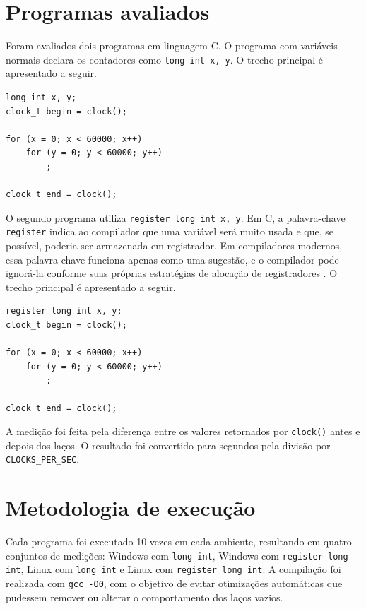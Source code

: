 \documentclass[12pt,oneside,a4paper,brazil]{abntex2}
\begin{document}
\section{Programas avaliados}

Foram avaliados dois programas em linguagem C. O programa com variáveis normais declara os contadores como \texttt{long int x, y}. O trecho principal é apresentado a seguir.

\begin{lstlisting}[style=codigoC,caption={Trecho principal com variáveis long int}]
long int x, y;
clock_t begin = clock();

for (x = 0; x < 60000; x++)
    for (y = 0; y < 60000; y++)
        ;

clock_t end = clock();
\end{lstlisting}

O segundo programa utiliza \texttt{register long int x, y}. Em C, a palavra-chave \texttt{register} indica ao compilador que uma variável será muito usada e que, se possível, poderia ser armazenada em registrador. Em compiladores modernos, essa palavra-chave funciona apenas como uma sugestão, e o compilador pode ignorá-la conforme suas próprias estratégias de alocação de registradores \cite{kernighan1988c,gcc2026}. O trecho principal é apresentado a seguir.

\begin{lstlisting}[style=codigoC,caption={Trecho principal com variáveis register long int}]
register long int x, y;
clock_t begin = clock();

for (x = 0; x < 60000; x++)
    for (y = 0; y < 60000; y++)
        ;

clock_t end = clock();
\end{lstlisting}

A medição foi feita pela diferença entre os valores retornados por \texttt{clock()} antes e depois dos laços. O resultado foi convertido para segundos pela divisão por \texttt{CLOCKS\_PER\_SEC}.

\section{Metodologia de execução}

Cada programa foi executado 10 vezes em cada ambiente, resultando em quatro conjuntos de medições: Windows com \texttt{long int}, Windows com \texttt{register long int}, Linux com \texttt{long int} e Linux com \texttt{register long int}. A compilação foi realizada com \texttt{gcc -O0}, com o objetivo de evitar otimizações automáticas que pudessem remover ou alterar o comportamento dos laços vazios.
\end{document}
